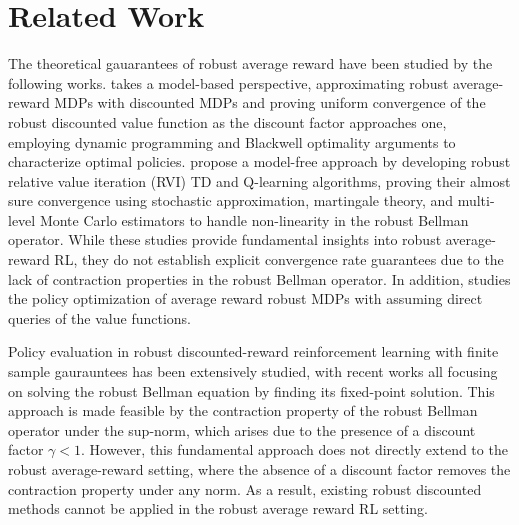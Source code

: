 \section{Related Work}
The theoretical gauarantees of robust average reward have been studied by the following works. \citep{wang2023robust} takes a model-based perspective, approximating robust average-reward MDPs with discounted MDPs and proving uniform convergence of the robust discounted value function as the discount factor approaches one, employing dynamic programming and Blackwell optimality arguments to characterize optimal policies. \citep{wang2023model} propose a model-free approach by developing robust relative value iteration (RVI) TD and Q-learning algorithms, proving their almost sure convergence using stochastic approximation, martingale theory, and multi-level Monte Carlo estimators to handle non-linearity in the robust Bellman operator. While these studies provide fundamental insights into robust average-reward RL, they do not establish explicit convergence rate guarantees due to the lack of contraction properties in the robust Bellman operator. In addition, \citep{sunpolicy2024} studies the policy optimization of average reward robust MDPs with assuming direct queries of the value functions.



Policy evaluation in robust discounted-reward reinforcement learning with finite sample gaurauntees has been extensively studied, with recent works \citep{wang2022policy, zhou2024natural, li2022first, kumar2023policy, kuang2022learning} all focusing on solving the robust Bellman equation by finding its fixed-point solution. This approach is made feasible by the contraction property of the robust Bellman operator under the sup-norm, which arises due to the presence of a discount factor $\gamma < 1$. However, this fundamental approach does not directly extend to the robust average-reward setting, where the absence of a discount factor removes the contraction property under any norm. As a result, existing robust discounted methods cannot be applied in the robust average reward RL setting.